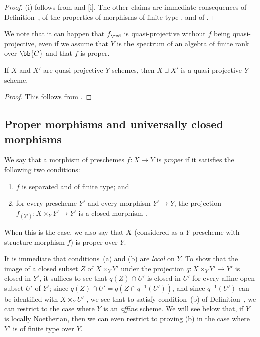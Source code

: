 \begin{proof}
(i) follows from  and [i].
The other claims are immediate consequences of Definition~, of the properties of morphisms of finite type , and of .
\end{proof}

\begin{remark}[5.3.5]
\label{II.5.3.5}
We note that it can happen that $f_\red$ is quasi-projective without $f$ being quasi-projective, even if we assume that $Y$ is the spectrum of an algebra of finite rank over $\bb{C}$ and that $f$ is proper.
\end{remark}

\begin{corollary}[5.3.6]
\label{II.5.3.6}
If $X$ and $X'$ are quasi-projective $Y$-schemes, then $X\sqcup X'$ is a quasi-projective $Y$-scheme.
\end{corollary}

\begin{proof}
This follows from .
\end{proof}

\subsection{Proper morphisms and universally closed morphisms}
\label{subsection:II.5.4}

\begin{definition}[5.4.1]
\label{II.5.4.1}
We say that a morphism of preschemes $f:X\to Y$ is \emph{proper} if it satisfies the following two conditions:
\begin{enumerate}
  \item[(a)] $f$ is separated and of finite type; and
  \item[(b)] for every prescheme $Y'$ and every morphism $Y'\to Y$, the projection $f_{(Y')}:X\times_Y Y'\to Y'$ is a closed morphism .
\end{enumerate}

When this is the case, we also say that $X$ (considered as a $Y$-prescheme with structure morphism $f$) is proper over $Y$.
\end{definition}

It is immediate that conditions~(a) and (b) are \emph{local} on $Y$.
To show that the image of a closed subset $Z$ of $X\times_Y Y'$ under the projection $q:X\times_Y Y'\to Y'$ is closed in $Y'$, it suffices to see that $q(Z)\cap U'$ is closed in $U'$ for every affine open subset $U'$ of $Y'$;
since $q(Z)\cap U'=q(Z\cap q^{-1}(U'))$, and since $q^{-1}(U')$ can be identified with $X\times_Y U'$ , we see that to satisfy condition~(b) of Definition~, we can restrict to the case where $Y$ is an \emph{affine} scheme.
We will see below  that, if $Y$ is locally Noetherian, then we can even restrict to proving (b) in the case where $Y'$ is of finite type over $Y$.

